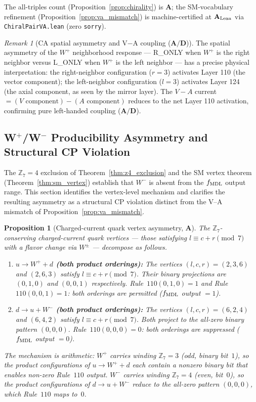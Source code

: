 \documentclass[11pt]{article}
\newtheorem{proposition}[theorem]{Proposition}
\theoremstyle{remark}
\newtheorem{remark}[theorem]{Remark}
\newcommand{\ZS}{\mathbb{Z}_7}
\newcommand{\CatA}{\textbf{A}}
\newcommand{\CatAL}{\ensuremath{\textbf{A}_{\rm Lean}}}
\newcommand{\CatAD}{\textbf{A/D}}
\begin{document}
The all-triples count (Proposition~\ref{prop:chirality}) is $\CatA$; the SM-vocabulary
refinement (Proposition~\ref{prop:va_mismatch}) is machine-certified at $\CatAL$
via \texttt{ChiralPairVA.lean} (zero \texttt{sorry}).

\begin{remark}[CA spatial asymmetry and V$-$A coupling ($\CatAD$)]
The spatial asymmetry of the $W^+$ neighborhood response --- R\_ONLY when $W^+$ is the right neighbor versus L\_ONLY when $W^+$ is the left neighbor --- has a precise physical interpretation: the right-neighbor configuration ($r=3$) activates Layer 110 (the vector component); the left-neighbor configuration ($l=3$) activates Layer 124 (the axial component, as seen by the mirror layer). The $V-A$ current $= (V\text{ component}) - (A\text{ component})$ reduces to the net Layer 110 activation, confirming pure left-handed coupling ($\CatAD$).
\end{remark}

\subsection{W$^+$/W$^-$ Producibility Asymmetry and Structural CP Violation}
\label{sec:wplus_wminus_asymmetry}

The $\ZS = 4$ exclusion of Theorem~\ref{thm:z4_exclusion} and the SM vertex
theorem (Theorem~\ref{thm:sm_vertex}) establish that $W^-$ is absent from the
$f_{\rm MDL}$ output range.
This section identifies the vertex-level mechanism and clarifies the resulting
asymmetry as a structural CP violation distinct from the V--A mismatch of
Proposition~\ref{prop:va_mismatch}.

\begin{proposition}[Charged-current quark vertex asymmetry, $\CatA$]
\label{prop:cc_quark_asymmetry}
The $\ZS$-conserving charged-current quark vertices --- those satisfying
$l \equiv c + r \pmod{7}$ with a flavor change via $W^{\pm}$ --- decompose
as follows.
\begin{enumerate}[nosep,leftmargin=1.5em]
\item \textbf{$u \to W^+ + d$ (both product orderings):}
  The vertices $(l,c,r) = (2,3,6)$ and $(2,6,3)$ satisfy $l \equiv c + r \pmod 7$.
  Their binary projections are $(0,1,0)$ and $(0,0,1)$ respectively.
  Rule~$110(0,1,0) = 1$ and Rule~$110(0,0,1) = 1$: both orderings are
  \emph{permitted} ($f_{\rm MDL}$ output $= 1$).
\item \textbf{$d \to u + W^-$ (both product orderings):}
  The vertices $(l,c,r) = (6,2,4)$ and $(6,4,2)$ satisfy $l \equiv c + r \pmod 7$.
  Both project to the all-zero binary pattern $(0,0,0)$.
  Rule~$110(0,0,0) = 0$: both orderings are \emph{suppressed} ($f_{\rm MDL}$ output $= 0$).
\end{enumerate}
The mechanism is arithmetic: $W^+$ carries winding $\ZS = 3$ (odd, binary bit~$1$),
so the product configurations of $u \to W^+ + d$ each contain a nonzero binary bit
that enables non-zero Rule~$110$ output.
$W^-$ carries winding $\ZS = 4$ (even, bit~$0$), so the product configurations of
$d \to u + W^-$ reduce to the all-zero pattern $(0,0,0)$, which Rule~$110$ maps to~$0$.
\end{proposition}
\end{document}
